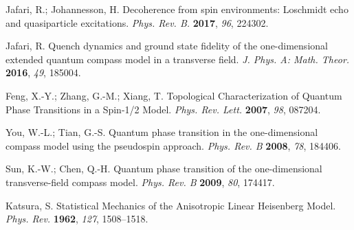 \documentclass[twocolumn,floats,superscriptaddress]{revtex4}
\begin{document}
\begin{thebibliography}{999}
Jafari, R.; Johannesson, H. Decoherence from spin environments: Loschmidt echo and quasiparticle excitations. \emph{Phys. Rev. B.} {\bf 2017}, {\it96}, 224302.

 Jafari, R. Quench dynamics and ground state fidelity of the one-dimensional extended quantum compass model in a transverse field. \emph{J. Phys. A: Math. Theor.} {\bf 2016}, {\it49}, 185004.


Feng, X.-Y.; Zhang, G.-M.; Xiang, T. Topological Characterization of Quantum Phase Transitions in a Spin-1/2 Model. \emph{Phys. Rev. Lett.} {\bf 2007}, {\it98}, 087204.


 You, W.-L.; Tian, G.-S. Quantum phase transition in the one-dimensional compass model using the pseudospin approach. \emph{Phys. Rev. B} {\bf 2008}, {\it78}, 184406.

 Sun, K.-W.; Chen, Q.-H. Quantum phase transition of the one-dimensional transverse-field compass model. \emph{Phys. Rev. B} {\bf 2009}, {\it80}, 174417.


 {Katsura, S. Statistical Mechanics of the Anisotropic Linear Heisenberg Model. \emph{Phys. Rev.} {\bf1962}, {\it127}, 1508--1518.}




\end{thebibliography}
\end{document}
